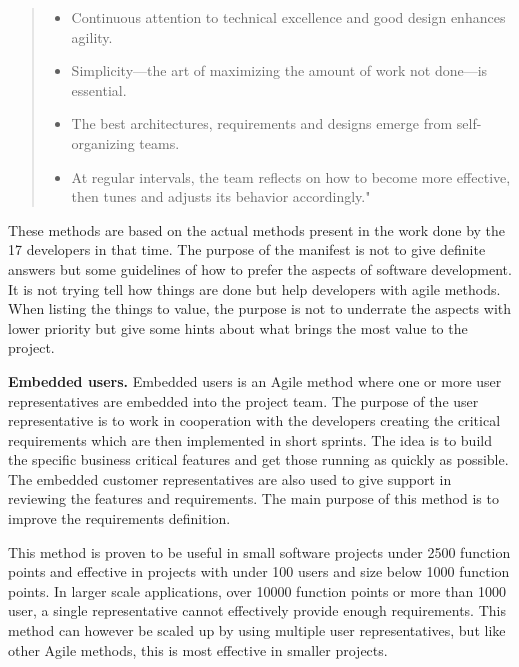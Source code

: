 \begin{quote}
\begin{itemize}
	\item Continuous attention to technical excellence and good design enhances agility.  
	\item Simplicity—the art of maximizing the amount of work not done—is essential.  
	\item The best architectures, requirements and designs emerge from self-organizing teams.  
	\item At regular intervals, the team reflects on how to become more effective, then tunes and adjusts its behavior accordingly."

	\end{itemize}

\end{quote}

These methods are based on the actual methods present in the work done by the 17 developers in that time. The purpose of the manifest is not to give definite answers but some guidelines of how to prefer the aspects of software development. It is not trying tell how things are done but help developers with agile methods. When listing the things to value, the purpose is not to underrate the aspects with lower priority but give some hints about what brings the most value to the project.~\cite{beck2001agile}




\textbf{Embedded users.} Embedded users is an Agile method where one or more user representatives are embedded into the project team. The purpose of the user representative is to work in cooperation with the developers creating the critical requirements which are then implemented in short sprints. The idea is to build the specific business critical features and get those running as quickly as possible. The embedded customer representatives are also used to give support in reviewing the features and requirements. The main purpose of this method is to improve the requirements definition.

This method is proven to be useful in small software projects under 2500 function points and effective in projects with under 100 users and size below 1000 function points. In larger scale applications, over 10000 function points or more than 1000 user, a single representative cannot effectively provide enough requirements. This method can however be scaled up by using multiple user representatives, but like other Agile methods, this is most effective in smaller projects.

